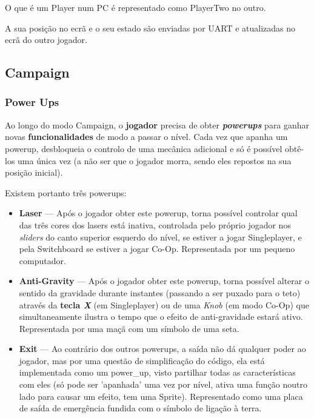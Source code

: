 \documentclass{report}
\begin{document}
O que é um Player num PC é representado como PlayerTwo no outro.

A sua posição no ecrã e o seu estado são enviadas por UART e atualizadas no ecrã do outro jogador.

\subsection{Campaign}


\subsubsection{Power Ups}

Ao longo do modo Campaign, o \textbf{jogador} precisa de obter \textbf{\textit{powerups}} para ganhar novas \textbf{funcionalidades} de modo a passar o nível. Cada vez que apanha um powerup, desbloqueia o controlo de uma mecânica adicional e só é possível obtê-los uma única vez (a não ser que o jogador morra, sendo eles repostos na sua posição inicial).

Existem portanto três powerups:

\begin{itemize}
	\item \textbf{Laser} --- Após o jogador obter este powerup, torna possível controlar qual das três cores dos lasers está inativa, controlada pelo próprio jogador nos \textit{sliders} do canto superior esquerdo do nível, se estiver a jogar Singleplayer, e pela Switchboard se estiver a jogar Co-Op. Representada por um pequeno computador.

	\item \textbf{Anti-Gravity} --- Após o jogador obter este powerup, torna possível alterar o sentido da gravidade durante instantes (passando a ser puxado para o teto) através da \textbf{tecla \textit{X}} (em Singleplayer) ou de uma \textit{Knob}  (em  modo Co-Op) que simultaneamente ilustra o tempo que o efeito de anti-gravidade estará ativo. Representada por uma maçã com um símbolo de uma seta.

	\item \textbf{Exit} --- Ao contrário dos outros powerups, a saída não dá qualquer poder ao jogador, mas por uma questão de simplificação do código, ela está implementada como um power\_up, visto partilhar todas as características com eles (só pode ser 'apanhada' uma vez por nível, ativa uma função noutro lado para causar um efeito, tem uma Sprite). Representado como uma placa de saída de emergência fundida com o símbolo de ligação à terra.
\end{itemize}
\end{document}
